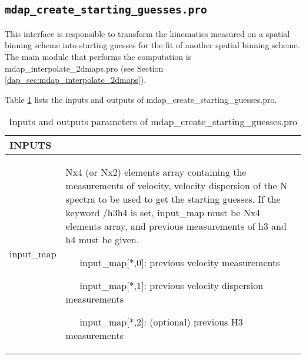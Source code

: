 \subsection{{\tt mdap\_create\_starting\_guesses.pro}}
\label{dap_sec:mdap_create_starting_guesses}


This interface is responsible to transform the kinematics measured on
a spatial binning scheme into starting guesses for the fit of another
spatial binning scheme. The main module that performs the computation
is mdap\_interpolate\_2dmaps.pro (see Section
\ref{dap_sec:mdap_interpolate_2dmaps}). 

Table \ref{dap_tab:mdap_create_starting_guesses} lists the inputs and
outputs of mdap\_create\_starting\_guesses.pro.


\begin{center}
\begin{longtable}{p{2.7cm}| p{11.1cm}}
\caption{Inputs and outputs  parameters of mdap\_create\_starting\_guesses.pro} \label{dap_tab:mdap_create_starting_guesses} \\
\hline
{\bf  INPUTS} & \\
\hline
\endfirsthead
\hline
\endhead
\hline
\endlastfoot
\hline
 input\_map  & Nx4 (or Nx2)  elements array containing the measurements  of velocity, velocity dispersion 
              of the N spectra to be used to get the starting guesses. If the keyword /h3h4 is set, input\_map
              must be Nx4 elements array, and previous measurements of h3 and h4 must be given.

              \medskip

              \ \ \ input\_map[*,0]: previous velocity measurements

              \ \ \ input\_map[*,1]: previous velocity dispersion measurements

              \ \ \ input\_map[*,2]: (optional) previous H3 measurements


\end{longtable}
\end{center}
